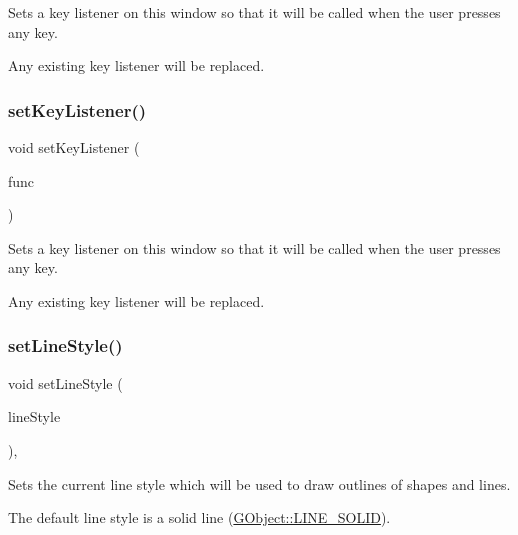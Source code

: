 Sets a key listener on this window so that it will be called when the user presses any key. 

Any existing key listener will be replaced. \mbox{\label{classGWindow_ae48ecea73606c7bd9423e1c7cc589cc9}} 
\subsubsection{\texorpdfstring{set\+Key\+Listener()}{setKeyListener()}\hspace{0.1cm}{\footnotesize\ttfamily [2/2]}}
{\footnotesize\ttfamily void set\+Key\+Listener (\begin{DoxyParamCaption}\item[{G\+Event\+Listener\+Void}]{func }\end{DoxyParamCaption})\hspace{0.3cm}{\ttfamily [virtual]}}



Sets a key listener on this window so that it will be called when the user presses any key. 

Any existing key listener will be replaced. \mbox{\label{classGDrawingSurface_a6bfe14a77101db0fb97b5a7e07a5526b}} 
\subsubsection{\texorpdfstring{set\+Line\+Style()}{setLineStyle()}}
{\footnotesize\ttfamily void set\+Line\+Style (\begin{DoxyParamCaption}\item[{\mbox{\hyperlink{classGObject_a86e0f5648542856159bb40775c854aa7}{G\+Object\+::\+Line\+Style}}}]{line\+Style }\end{DoxyParamCaption})\hspace{0.3cm}{\ttfamily [virtual]}, {\ttfamily [inherited]}}



Sets the current line style which will be used to draw outlines of shapes and lines. 

The default line style is a solid line (\mbox{\hyperlink{classGObject_a86e0f5648542856159bb40775c854aa7a700c78bc2cd76acaab26651bf7b4941f}{G\+Object\+::\+L\+I\+N\+E\+\_\+\+S\+O\+L\+ID}}). \mbox{\label{classGForwardDrawingSurface_a22b7be843264ca79a9bb3851ce3368b9}} 
